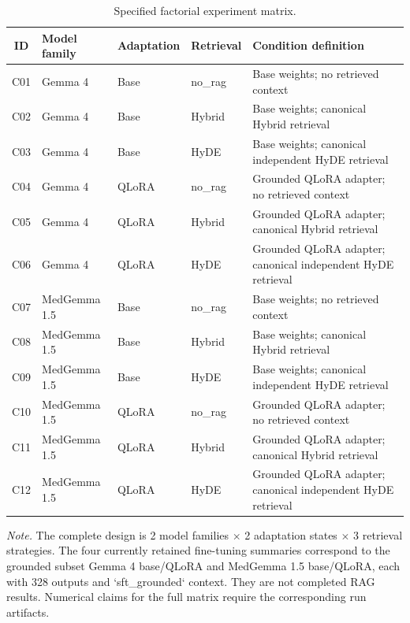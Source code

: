 \documentclass[11pt]{article}
\begin{document}
\begin{table}[htbp]
\centering
\scriptsize
\caption{Specified factorial experiment matrix.}
\label{tab:factorial-matrix}
\begin{tabularx}{\textwidth}{c l l l X}
\toprule
\textbf{ID} & \textbf{Model family} & \textbf{Adaptation} & \textbf{Retrieval} & \textbf{Condition definition} \\
\midrule
C01 & Gemma 4 & Base & no\_rag & Base weights; no retrieved context \\
C02 & Gemma 4 & Base & Hybrid & Base weights; canonical Hybrid retrieval \\
C03 & Gemma 4 & Base & HyDE & Base weights; canonical independent HyDE retrieval \\
C04 & Gemma 4 & QLoRA & no\_rag & Grounded QLoRA adapter; no retrieved context \\
C05 & Gemma 4 & QLoRA & Hybrid & Grounded QLoRA adapter; canonical Hybrid retrieval \\
C06 & Gemma 4 & QLoRA & HyDE & Grounded QLoRA adapter; canonical independent HyDE retrieval \\
C07 & MedGemma 1.5 & Base & no\_rag & Base weights; no retrieved context \\
C08 & MedGemma 1.5 & Base & Hybrid & Base weights; canonical Hybrid retrieval \\
C09 & MedGemma 1.5 & Base & HyDE & Base weights; canonical independent HyDE retrieval \\
C10 & MedGemma 1.5 & QLoRA & no\_rag & Grounded QLoRA adapter; no retrieved context \\
C11 & MedGemma 1.5 & QLoRA & Hybrid & Grounded QLoRA adapter; canonical Hybrid retrieval \\
C12 & MedGemma 1.5 & QLoRA & HyDE & Grounded QLoRA adapter; canonical independent HyDE retrieval \\
\bottomrule
\end{tabularx}
\par\smallskip
\parbox{\textwidth}{\footnotesize\textit{Note.} The complete design is 2 model families $\times$ 2 adaptation states $\times$ 3 retrieval strategies. The four currently retained fine-tuning summaries correspond to the grounded subset Gemma 4 base/QLoRA and MedGemma 1.5 base/QLoRA, each with 328 outputs and `sft\_grounded` context. They are not completed RAG results. Numerical claims for the full matrix require the corresponding run artifacts.}
\end{table}

\enlargethispage{2\baselineskip}
\end{document}
